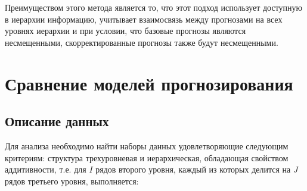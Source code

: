 \documentclass[12pt,a4paper, oneside]{extreport}
\begin{document}
%
%
%
%
%
%
%
%
%
%	
%	
%	
%	
%	
%	
%	
%	
%	
%	
%	
%

Преимуществом этого метода является то, что этот подход использует  доступную в иерархии информацию, учитывает взаимосвязь   между  прогнозами  на всех  уровнях иерархии и  при условии, что базовые прогнозы являются несмещенными, скорректированные прогнозы также будут несмещенными. 



\chapter{Сравнение моделей прогнозирования}





\section{Описание данных}

Для анализа  необходимо найти наборы данных удовлетворяющие следующим критериям: 
структура трехуровневая и иерархическая, обладающая свойством аддитивности, т.е. для $I$ рядов второго уровня, каждый из которых делится на $J$ рядов третьего уровня, выполняется: 
\end{document}
